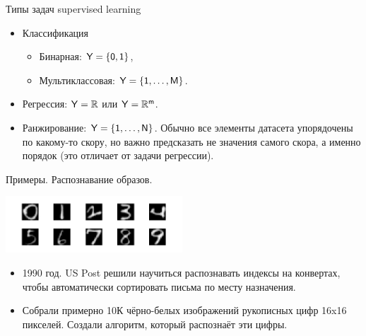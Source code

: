 \documentclass[9pt]{beamer}
\begin{document}
\begin{frame}{Типы задач supervised learning}
\begin{itemize}
    \item Классификация
    \begin{itemize}
        \item Бинарная: $\sf{Y} = \{0, 1\}$,
        \item Мультиклассовая: $\sf{Y} = \{1, \ldots, M\}$.
    \end{itemize}
    \item Регрессия: $\sf{Y} = \mathbb{R}$ или $\sf{Y} =  \mathbb{R}^m$.
    \item Ранжирование: $\sf{Y} = \{1, \ldots, N\}$.
    Обычно все элементы датасета упорядочены по какому-то скору, но важно предсказать не значения самого скора, а именно порядок (это отличает от задачи регрессии).
\end{itemize}
\end{frame}

\begin{frame}{Примеры. Распознавание образов.}
\begin{center}\includegraphics[height=80px]{img/intro_digit_recognition.png}\end{center}
    \begin{itemize}
        \item 1990 год. US Post решили научиться распознавать индексы на конвертах, чтобы автоматически сортировать письма по месту назначения.
        \item Собрали примерно 10К чёрно-белых изображений рукописных цифр 16x16 пикселей. Создали алгоритм, который распознаёт эти цифры.
    \end{itemize}
\end{frame}
\end{document}
